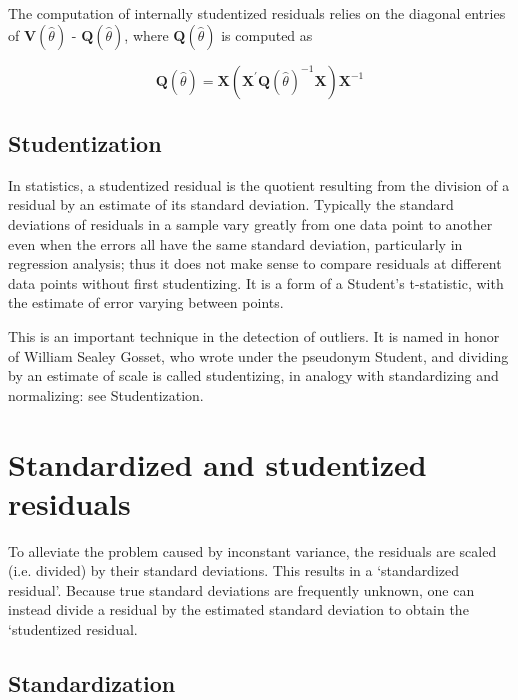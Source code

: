 \documentclass[Main.tex]{subfiles}
\begin{document}
The computation of internally studentized residuals relies on the diagonal entries of $\boldsymbol{V} (\hat{\theta})$ - $\boldsymbol{Q} (\hat{\theta})$, where $\boldsymbol{Q} (\hat{\theta})$ is computed as

\[ \boldsymbol{Q} (\hat{\theta}) = \boldsymbol{X} ( \boldsymbol{X}^{\prime}\boldsymbol{Q} (\hat{\theta})^{-1}\boldsymbol{X})\boldsymbol{X}^{-1} \]


\newpage

\subsection{Studentization}
In statistics, a studentized residual is the quotient resulting from the division of a residual by an estimate of its standard deviation. Typically the standard deviations of residuals in a sample vary greatly from one data point to another even when the errors all have the same standard deviation, particularly in regression analysis; thus it does not make sense to compare residuals at different data points without first studentizing. It is a form of a Student's t-statistic, with the estimate of error varying between points.

This is an important technique in the detection of outliers. It is named in honor of William Sealey Gosset, who wrote under the pseudonym Student, and dividing by an estimate of scale is called studentizing, in analogy with standardizing and normalizing: see Studentization.

\newpage
\newpage
\section{Standardized and studentized residuals} %

To alleviate the problem caused by inconstant variance, the residuals are scaled (i.e. divided) by their standard deviations. This results in a `standardized residual'. Because true standard deviations are frequently unknown, one can instead divide a residual by the estimated standard deviation to obtain the `studentized residual. 

\subsection{Standardization} %
\end{document}
